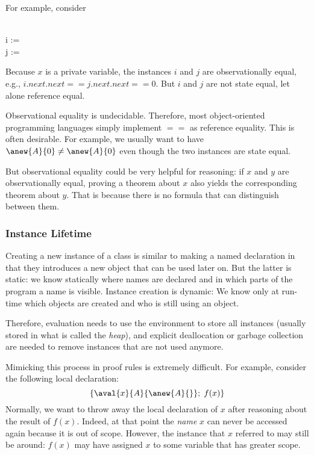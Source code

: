 For example, consider
\begin{acode}
\\
i := \\
j := 
\end{acode}
Because $x$ is a private variable, the instances $i$ and $j$ are observationally equal, e.g., $i.next.next == j.next.next == 0$.
But $i$ and $j$ are not state equal, let alone reference equal.

Observational equality is undecidable.
Therefore, most object-oriented programming languages simply implement $==$ as reference equality.
This is often desirable.
For example, we usually want to have $\anew{A}{0}\neq \anew{A}{0}$ even though the two instances are state equal.

But observational equality could be very helpful for reasoning: if $x$ and $y$ are observationally equal, proving a theorem about $x$ also yields the corresponding theorem about $y$.
That is because there is no formula that can distinguish between them.

\subsubsection{Instance Lifetime}

Creating a new instance of a class is similar to making a named declaration in that they introduces a new object that can be used later on.
But the latter is static: we know statically where names are declared and in which parts of the program a name is visible.
Instance creation is dynamic: We know only at run-time which objects are created and who is still using an object.

Therefore, evaluation needs to use the environment to store all instances (usually stored in what is called the \emph{heap}), and explicit deallocation or garbage collection are needed to remove instances that are not used anymore.

Mimicking this process in proof rules is extremely difficult.
For example, consider the following local declaration:
\[\{\aval{x}{A}{\anew{A}{}} ;\; f(x)\}\]
Normally, we want to throw away the local declaration of $x$ after reasoning about the result of $f(x)$.
Indeed, at that point the \emph{name} $x$ can never be accessed again because it is out of scope.
However, the instance that $x$ referred to may still be around: $f(x)$ may have assigned $x$ to some variable that has greater scope.

